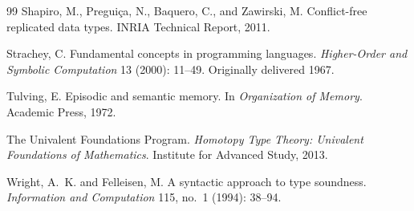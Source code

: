 \documentclass[12pt, a4paper, openany]{book}
\theoremstyle{plain}
\theoremstyle{definition}
\theoremstyle{remark}
\begin{document}
\begin{thebibliography}{99}
Shapiro, M., Pregui\c{c}a, N., Baquero, C., and Zawirski, M. Conflict-free
replicated data types. INRIA Technical Report, 2011.

Strachey, C. Fundamental concepts in programming languages. \emph{Higher-Order
and Symbolic Computation} 13 (2000): 11--49. Originally delivered 1967.

Tulving, E. Episodic and semantic memory. In \emph{Organization of Memory}.
Academic Press, 1972.

The Univalent Foundations Program. \emph{Homotopy Type Theory: Univalent
Foundations of Mathematics}. Institute for Advanced Study, 2013.

Wright, A.~K. and Felleisen, M. A syntactic approach to type soundness.
\emph{Information and Computation} 115, no.~1 (1994): 38--94.

\end{thebibliography}
\end{document}
